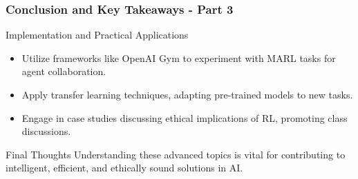 \documentclass[aspectratio=169]{beamer}
\begin{document}
\begin{frame}[fragile]
  \frametitle{Conclusion and Key Takeaways - Part 3}
  \begin{block}{Implementation and Practical Applications}
      \begin{itemize}
          \item Utilize frameworks like OpenAI Gym to experiment with MARL tasks for agent collaboration.
          \item Apply transfer learning techniques, adapting pre-trained models to new tasks.
          \item Engage in case studies discussing ethical implications of RL, promoting class discussions.
      \end{itemize}
  \end{block}

  \begin{block}{Final Thoughts}
      Understanding these advanced topics is vital for contributing to intelligent, efficient, and ethically sound solutions in AI.
  \end{block}
\end{frame}
\end{document}

